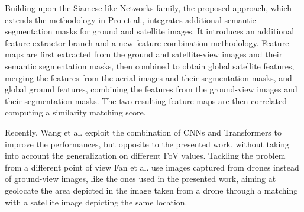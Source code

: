 %
%
Building upon the Siamese-like Networks family, the proposed approach, which extends the methodology in Pro et al.\cite{pro2024}, integrates additional semantic segmentation masks for ground and satellite images. It introduces an additional feature extractor branch and a new feature combination methodology. Feature maps are first extracted from the ground and satellite-view images and their semantic segmentation masks, then combined to obtain global satellite
features, merging the features from the aerial images and their segmentation masks, and global ground features, combining the features from the ground-view images and their segmentation masks. The two resulting feature maps are then correlated computing a similarity matching score.

Recently, Wang et al.\cite{10.1145/3664647.3681431} exploit the combination of CNNs and Transformers to improve the performances, but opposite to the presented work, without taking into account the generalization on different FoV values. Tackling the problem from a different point of view Fan et al.\cite{s24123719} use images captured from drones instead of ground-view images, like the ones used in the presented work, aiming at geolocate the area depicted in the image taken from a drone through a matching with a satellite image depicting the same location.
